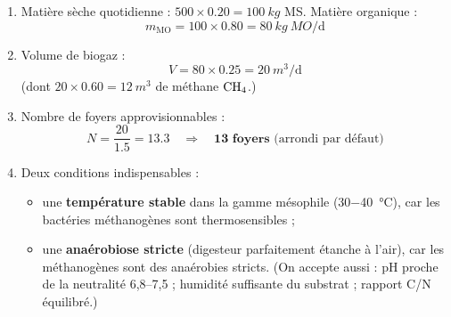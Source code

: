 \documentclass[11pt]{article}
\begin{document}
\begin{corrige}
\begin{enumerate}
\item Matière sèche quotidienne : $500 \times \num{0,20} = \SI{100}{kg}$ MS. Matière organique :
\[ m_{\text{MO}} = 100 \times \num{0,80} = \SI{80}{kg\ MO\per\day} \]
\item Volume de biogaz :
\[ V = 80 \times \num{0,25} = \SI{20}{m^3\per\day} \]
(dont $20 \times \num{0,60} = \SI{12}{m^3}$ de méthane $\ce{CH4}$.)
\item Nombre de foyers approvisionnables :
\[ N = \frac{20}{\num{1,5}} = \num{13,3} \quad \Rightarrow \quad \textbf{13 foyers} \text{ (arrondi par défaut)} \]
\item Deux conditions indispensables :
\begin{itemize}
\item une \textbf{température stable} dans la gamme mésophile (\SI{30-40}{\degreeCelsius}), car les bactéries méthanogènes sont thermosensibles ;
\item une \textbf{anaérobiose stricte} (digesteur parfaitement étanche à l'air), car les méthanogènes sont des anaérobies stricts. (On accepte aussi : pH proche de la neutralité 6,8--7,5 ; humidité suffisante du substrat ; rapport C/N équilibré.)
\end{itemize}
\end{enumerate}
\end{corrige}
\end{document}
